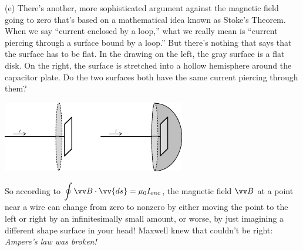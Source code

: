 (e)  There's another, more sophisticated argument against the magnetic field going to zero that's based on a mathematical idea known as Stoke's Theorem.  When we say ``current enclosed by a loop,'' what we really mean is ``current piercing through a surface bound by a loop.'' But there's nothing that says that the surface has to be flat.  In the drawing on the left, the gray surface is a flat disk.  On the right, the surface is stretched into a hollow hemisphere around the capacitor plate.  Do the two surfaces both have the same current piercing through them?
\begin{center}
\vspace{-0.1in}
    \includegraphics[width=0.6\textwidth]{deriving_em_waves/two_surfaces.eps}
\vspace{-0.1in}
\end{center}

So according to $\displaystyle \oint \vv B \cdot \vv{ds} = \mu_0I_{enc}$, the magnetic field $\vv B$ at a point near a wire can change from zero to nonzero by either moving the point to the left or right by an infinitesimally small amount, or worse, by just imagining a different shape surface in your head!  Maxwell knew that couldn't be right: \textit{Ampere's law was broken!}

